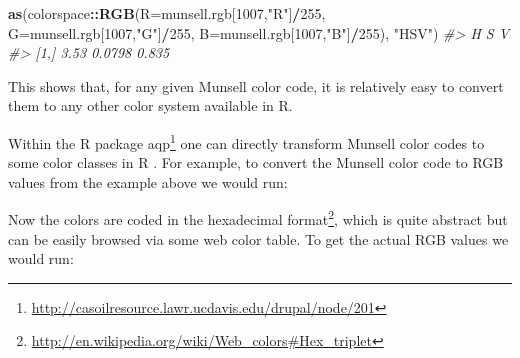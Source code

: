 \documentclass[graybox,natbib,nospthms,UStrade]{svmono}
\newenvironment{Shaded}{\begin{snugshade}}{\end{snugshade}}
\newcommand{\CommentTok}[1]{\textcolor[rgb]{0.37,0.37,0.37}{\textit{#1}}}
\newcommand{\DataTypeTok}[1]{\textcolor[rgb]{0.27,0.27,0.27}{#1}}
\newcommand{\DecValTok}[1]{\textcolor[rgb]{0.06,0.06,0.06}{#1}}
\newcommand{\KeywordTok}[1]{\textcolor[rgb]{0.27,0.27,0.27}{\textbf{#1}}}
\newcommand{\NormalTok}[1]{#1}
\newcommand{\OperatorTok}[1]{\textcolor[rgb]{0.43,0.43,0.43}{\textbf{#1}}}
\newcommand{\StringTok}[1]{\textcolor[rgb]{0.5,0.5,0.5}{#1}}
\renewcommand{\href}[2]{#2 (\url{#1})}
\renewcommand{\href}[2]{#2\footnote{\url{#1}}}
\begin{document}
\begin{Shaded}
\begin{Highlighting}[]
\KeywordTok{as}\NormalTok{(colorspace}\OperatorTok{::}\KeywordTok{RGB}\NormalTok{(}\DataTypeTok{R=}\NormalTok{munsell.rgb[}\DecValTok{1007}\NormalTok{,}\StringTok{"R"}\NormalTok{]}\OperatorTok{/}\DecValTok{255}\NormalTok{, }
                   \DataTypeTok{G=}\NormalTok{munsell.rgb[}\DecValTok{1007}\NormalTok{,}\StringTok{"G"}\NormalTok{]}\OperatorTok{/}\DecValTok{255}\NormalTok{, }
                   \DataTypeTok{B=}\NormalTok{munsell.rgb[}\DecValTok{1007}\NormalTok{,}\StringTok{"B"}\NormalTok{]}\OperatorTok{/}\DecValTok{255}\NormalTok{), }\StringTok{"HSV"}\NormalTok{)}
\CommentTok{#>         H      S     V}
\CommentTok{#> [1,] 3.53 0.0798 0.835}
\end{Highlighting}
\end{Shaded}

This shows that, for any given Munsell color code, it is relatively easy to convert them to any other color system available in R.

Within the R \href{http://casoilresource.lawr.ucdavis.edu/drupal/node/201}{package aqp} one can directly transform Munsell color codes to some color classes in R \citep{Beaudette2013CompGeo}. For example, to convert the Munsell color code to RGB values from the example above we would run:

\begin{Shaded}
\end{Shaded}

Now the colors are coded in the \href{http://en.wikipedia.org/wiki/Web_colors\#Hex_triplet}{hexadecimal format}, which is quite abstract but can be easily browsed via some web color table. To get the actual RGB values we would run:

\begin{Shaded}
\end{Shaded}
\end{document}
